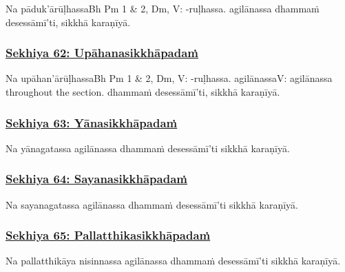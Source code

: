 Na pāduk'ārūḷhassa\makeatletter\hyperlink{endnote-appendix}\makeatother Bh Pm 1 & 2, Dm, V: -ruḷhassa. agilānassa dhammaṁ desessāmī'ti, sikkhā karaṇīyā.



\subsubsection*{\hyperref[training62]{Sekhiya 62: Upāhanasikkhāpadaṁ}}
\label{sekh62}

Na upāhan'ārūḷhassa\makeatletter\hyperlink{endnote-appendix}\makeatother Bh Pm 1 & 2, Dm, V: -ruḷhassa. agilānassa\makeatletter\hyperlink{endnote-appendix}\makeatother V: agilānassa throughout the section. dhammaṁ desessāmī'ti, sikkhā karaṇīyā.



\subsubsection*{\hyperref[training63]{Sekhiya 63: Yānasikkhāpadaṁ}}
\label{sekh63}

Na yānagatassa agilānassa dhammaṁ desessāmī'ti sikkhā karaṇīyā.



\subsubsection*{\hyperref[training64]{Sekhiya 64: Sayanasikkhāpadaṁ}}
\label{sekh64}

Na sayanagatassa agilānassa dhammaṁ desessāmī'ti sikkhā karaṇīyā.



\subsubsection*{\hyperref[training65]{Sekhiya 65: Pallatthikasikkhāpadaṁ}}
\label{sekh65}

Na pallatthikāya nisinnassa agilānassa dhammaṁ desessāmī'ti sikkhā karaṇīyā.



